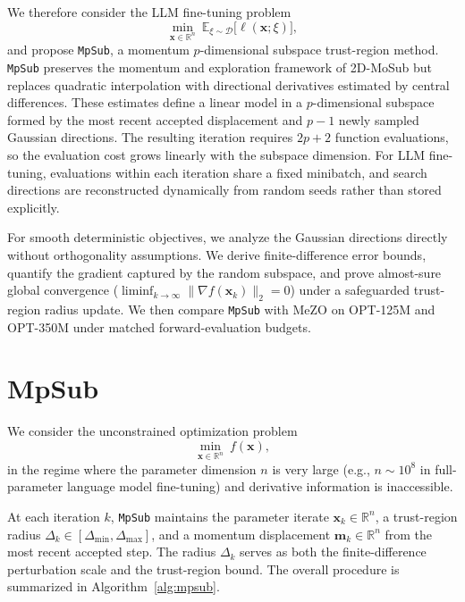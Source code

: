 \documentclass[smallextended]{svjour3}
\newcommand{\bx}{\bm{x}}
\begin{document}
We therefore consider the LLM fine-tuning problem
\begin{equation}
\min_{\bx \in \mathbb{R}^n}
\ \mathbb{E}_{\xi\sim\mathcal D}
\bigl[\ell(\bx;\xi)\bigr],
\label{eq:ft_objective}
\end{equation}
and propose \texttt{MpSub}, a momentum $p$-dimensional subspace trust-region method. \texttt{MpSub} preserves the momentum and exploration framework of 2D-MoSub but replaces quadratic interpolation with directional derivatives estimated by central differences. These estimates define a linear model in a $p$-dimensional subspace formed by the most recent accepted displacement and $p-1$ newly sampled Gaussian directions. The resulting iteration requires $2p+2$ function evaluations, so the evaluation cost grows linearly with the subspace dimension. For LLM fine-tuning, evaluations within each iteration share a fixed minibatch, and search directions are reconstructed dynamically from random seeds rather than stored explicitly.

For smooth deterministic objectives, we analyze the Gaussian directions directly without orthogonality assumptions. We derive finite-difference error bounds, quantify the gradient captured by the random subspace, and prove almost-sure global convergence ($\liminf_{k\to\infty} \|\nabla f(\bx_k)\|_2 = 0$) under a safeguarded trust-region radius update. We then compare \texttt{MpSub} with MeZO on OPT-125M and OPT-350M under matched forward-evaluation budgets.

\section{MpSub}
\label{section:MpSub}

We consider the unconstrained optimization problem
\begin{equation}
\min_{\bx \in \mathbb{R}^n}\ f(\bx),
\label{eq:opt_problem}
\end{equation}
in the regime where the parameter dimension $n$ is very large (e.g., $n \sim 10^8$ in full-parameter language model fine-tuning) and derivative information is inaccessible.

At each iteration $k$, \texttt{MpSub} maintains the parameter iterate $\bx_k \in \mathbb{R}^n$, a trust-region radius $\Delta_k \in [\Delta_{\min}, \Delta_{\max}]$, and a momentum displacement $\bm m_k \in \mathbb{R}^n$ from the most recent accepted step. The radius $\Delta_k$ serves as both the finite-difference perturbation scale and the trust-region bound. The overall procedure is summarized in Algorithm~\ref{alg:mpsub}.
\end{document}
